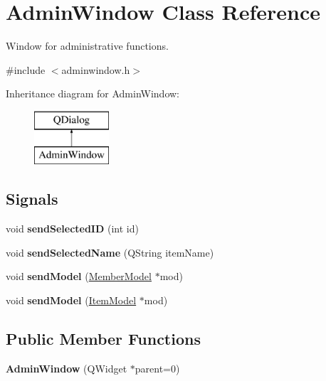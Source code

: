 \hypertarget{class_admin_window}{}\section{Admin\+Window Class Reference}
\label{class_admin_window}


Window for administrative functions.  




{\ttfamily \#include $<$adminwindow.\+h$>$}

Inheritance diagram for Admin\+Window\+:\begin{figure}[H]
\begin{center}
\leavevmode
\includegraphics[height=2.000000cm]{class_admin_window}
\end{center}
\end{figure}
\subsection*{Signals}
\begin{DoxyCompactItemize}
\item 
\mbox{\label{class_admin_window_a2e6bb3162aebae122abc71e1086b9541}} 
void {\bfseries send\+Selected\+ID} (int id)
\item 
\mbox{\label{class_admin_window_a5270281321fda37c184eec8d71741a79}} 
void {\bfseries send\+Selected\+Name} (Q\+String item\+Name)
\item 
\mbox{\label{class_admin_window_ad4114115ca5ea21c9959b6d35d9884f7}} 
void {\bfseries send\+Model} (\mbox{\hyperlink{class_member_model}{Member\+Model}} $\ast$mod)
\item 
\mbox{\label{class_admin_window_ae49b563c2006f8bf84aea31b1e24276a}} 
void {\bfseries send\+Model} (\mbox{\hyperlink{class_item_model}{Item\+Model}} $\ast$mod)
\end{DoxyCompactItemize}
\subsection*{Public Member Functions}
\begin{DoxyCompactItemize}
\item 
\mbox{\label{class_admin_window_a9851707c3d87acec48db6db86ae04ca4}} 
{\bfseries Admin\+Window} (Q\+Widget $\ast$parent=0)
\end{DoxyCompactItemize}
